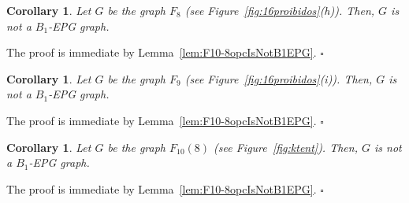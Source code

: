 \documentclass[9pt]{entcs}
\newtheorem{coro}[thm]{Corollary}%
\begin{document}


\begin{coro}\label{coro:f8}
Let $G$ be the graph $F_{8}$ (see Figure~\ref{fig:16proibidos}(h)). Then, $G$ is not a $B_1$-EPG graph. 
\end{coro}
\begin{pf}
The proof is immediate by Lemma~\ref{lem:F10-8opcIsNotB1EPG}. $\square$
\end{pf}

\begin{coro}\label{coro:f9}
Let $G$ be the graph $F_{9}$ (see Figure~\ref{fig:16proibidos}(i)). Then, $G$ is not a $B_1$-EPG  graph. 
\end{coro}
\begin{pf}
The proof is immediate by Lemma~\ref{lem:F10-8opcIsNotB1EPG}. $\square$
\end{pf}



\begin{coro}\label{coro:F108IsNotB1EPG}
Let $G$ be the graph $F_{10}(8)$ (see Figure~\ref{fig:ktent}). Then, $G$ is not a $B_1$-EPG graph. 
\end{coro}

\begin{pf}
The proof is immediate by Lemma~\ref{lem:F10-8opcIsNotB1EPG}. $\square$
\end{pf}


\end{document}
